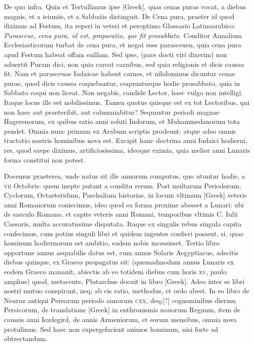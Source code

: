De quo infra.
Quin et Tertullianus ipse \textgreek{[Greek]},
quas cenas puras vocat, a diebus magnis, et a ieiuniis, et a
Sabbatis distinguit.
De Cena pura, praeter id quod diximus ad
Festum, ita reperi in veteri et peroptimo Glossario Latinoarabico:
\textit{Parasceue, cena pura, id est, praparatio, que fit prosabbato.}
Conditor Annalium Ecclesiasticorum turbat de cena
pura, et negat esse parasceuen, quia cena pura apud Festum
habeat offam suillam.
Sed ipse, (pace docti viri dixerim) non
aduertit Puram dici, non quia careat carnibus, sed quia religionis
et dicis caussa fit.
Nam et parasceuae Iudaicae habent carnes,
et nihilominus dicuntur cenae purae, quod dicis caussa coquebantur,
coquunturque hodie prosabbato, quia in Sabbato
coqui non liceat.
Non negabis, candide Lector, haec vulgo non intelligi.
Itaque locus ille est nobilissimus. 
Tamen quotus quisque est ex tot Lectoribus, qui non haec aut praeteribit,
aut calumniabitur?
Sequuntur periodi magnae Hagerenorum,
ex quibus ratio anni soluti Indorum, et Muhammedanorum
tota pendet.
Omnia nunc primum ex Arabum scriptis
prodeunt: atque adeo omnis tractatio nostris hominibus
nova est.
{}
Excipit hanc doctrina anni Iudaici hodierni, res, quod
saepe diximus, artificiosissima, ideoque eximia, quia melior
anni Lunaris forma constitui non potest.

Docemus praeterea, unde
natus sit ille annorum computus, quo utuntur hodie, a \textsc{vii} Octobris:
quem inepte putant a conditu rerum.
Post multarum Periodorum,
Cyclorum, Octaeteridum, Paschalium historias, in locum vltimum
\textgreek{[Greek]} veteris anni Romanorum coniecimus, ideo
quod ea forma proxime abesset a Lunari: ubi de saeculo Romano,
et capite veteris anni Romani, temporibus vltimis C. Iulii Caesaris,
multa accuratissime disputata.
Itaque ex singulis rebus singula capita
confecimus, cum potius singuli libri et quidem ingentes confieri
possent, si, quae hominum hodiernorum est ambitio, eadem nobis
incessisset.
Tertio libro opportune annus aequabilis datus est,
cum annus Solaris Aegyptiacus, adscitis diebus quinque, ex Graeco
propagatus sit: (quemadmodum annus Lunaris ex eodem Graeco
manauit, abiectis ab eo totidem diebus cum horis \textsc{xv}, paulo amplius)
quod, metacente, Plutarchus docuit in libro \textgreek{[Greek]}.
Adeo inter se libri nostri mutuo conspirant, neq; ab eis ratio,
methodus, et ordo abest.
In eo libro de Neuruz antiqui Persarum
periodo annorum \textsc{cxx}, deq;[?] cognominibus dierum Persicorum,
de translatione \textgreek{[Greek]} in enthronismis nouorum Regnum,
item de caussis anni Iezdegird, de annis Armeniorum, et eorum
mensibus, omnia nova protulimus. 
Sed haec non expergefacient animos
hominum, nisi forte ad obtrectandum.


